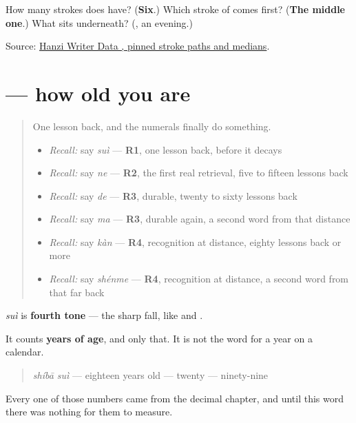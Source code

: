 \begin{tcolorbox}[breakable,colback=teal!4,colframe=teal!35!black,title={Before you move on}]
How many strokes does  have? (\textbf{Six}.) Which stroke of  comes first? (\textbf{The middle one}.) What sits underneath? (\textbf{}, an evening.)

Source: \href{https://raw.githubusercontent.com/chanind/hanzi-writer-data/68d10a4b21150cae5e1ebbd223eed289cf32d90c/data/\%E5\%B2\%81.json}{Hanzi Writer Data , pinned stroke paths and medians}.
\end{tcolorbox}
\section[\texorpdfstring{\zh{岁} (suì)}{岁 (suì)}]{ — how old you are}

\label{lesson:ZH-C27-sui}



\begin{quote}
One lesson back, and the numerals finally do something.

\begin{itemize}
\raggedright
  \item \emph{Recall:} say \emph{suì} — \textbf{R1}, one lesson back, before it decays
  \item \emph{Recall:} say \emph{ne} — \textbf{R2}, the first real retrieval, five to fifteen lessons back
  \item \emph{Recall:} say \emph{de} — \textbf{R3}, durable, twenty to sixty lessons back
  \item \emph{Recall:} say \emph{ma} — \textbf{R3}, durable again, a second word from that distance
  \item \emph{Recall:} say \emph{kàn} — \textbf{R4}, recognition at distance, eighty lessons back or more
  \item \emph{Recall:} say \emph{shénme} — \textbf{R4}, recognition at distance, a second word from that far back
\end{itemize}
\end{quote}

\begin{sounds}
\textbf{} \emph{suì} is \textbf{fourth tone} — the sharp fall, like  and .

It counts \textbf{years of age}, and only that. It is not the word for a year on a calendar.

\begin{quote}
\textbf{} \emph{shíbā suì} — eighteen years old \textbf{} — twenty \textbf{} — ninety-nine
\end{quote}

Every one of those numbers came from the decimal chapter, and until this word there was nothing for them to measure.
\end{sounds}

